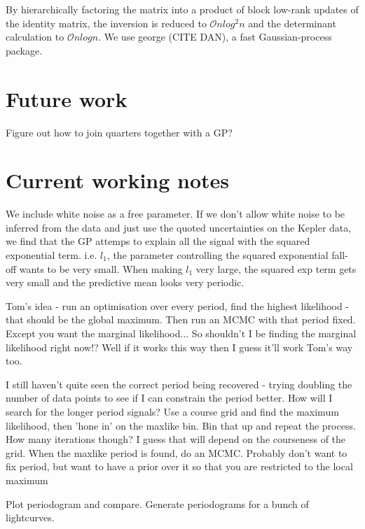 \documentclass[12pt,preprint]{aastex}
\begin{document}
By hierarchically factoring the matrix into a product of block low-rank updates of the identity matrix, the inversion is reduced to $\mathcal{O}nlog^2n$ and the determinant calculation to $\mathcal{O}nlogn$.
We use george (CITE DAN), a fast Gaussian-process package.

\section{Future work}

Figure out how to join quarters together with a GP?

\section{Current working notes}

We include white noise as a free parameter.
If we don't allow white noise to be inferred from the data and just use the quoted uncertainties on the Kepler data, we find that the GP attemps to explain all the signal with the squared exponential term.
i.e. $l_1$, the parameter controlling the squared exponential fall-off wants to be very small.
When making $l_1$ very large, the squared exp term gets very small and the predictive mean looks very periodic.

Tom's idea - run an optimisation over every period, find the highest likelihood - that should be the global maximum.
Then run an MCMC with that period fixed.
Except you want the marginal likelihood...
So shouldn't I be finding the marginal likelihood right now!?
Well if it works this way then I guess it'll work Tom's way too.

I still haven't quite seen the correct period being recovered - trying doubling the number of data points to see if I can constrain the period better.
How will I search for the longer period signals?
Use a course grid and find the maximum likelihood, then 'hone in' on the maxlike bin.
Bin that up and repeat the process.
How many iterations though?
I guess that will depend on the courseness of the grid.
When the maxlike period is found, do an MCMC.
Probably don't want to fix period, but want to have a prior over it so that you are restricted to the local maximum

Plot periodogram and compare.
Generate periodograms for a bunch of lightcurves.
\end{document}
